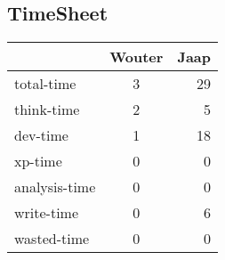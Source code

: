 \subsection*{TimeSheet}
\label{time}

\begin{tabular}{ l || c | r }
\hline
  & Wouter & Jaap \\
\hline
  total-time & 3 & 29 \\
\hline
  think-time & 2 & 5 \\
\hline
  dev-time & 1 & 18 \\
\hline
  xp-time & 0 & 0 \\
\hline
  analysis-time & 0 & 0 \\
\hline
  write-time & 0 & 6 \\
\hline
  wasted-time & 0 & 0 \\
\end{tabular}